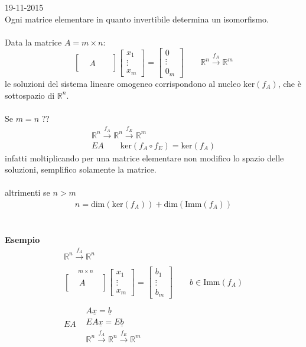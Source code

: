 \documentclass[italian]{article}
\newcommand{\ins}[1]{\text{$\mathbb{#1}$}}
\newcommand{\tright}[1]{\hfill #1 \\}
\renewcommand{\dim}[1]{\text{dim$\left(#1\right)$}}
\renewcommand{\ker}[1]{\text{ker$\left(#1\right)$}}
\newcommand{\imm}[1]{\text{Imm$\left(#1\right)$}}
\begin{document}
\newpage
\tright{19-11-2015}
Ogni matrice elementare in quanto invertibile determina un isomorfismo.\\\\
Data la matrice $A = m \times n$:
\[
	\begin{bmatrix}
		&&& \\ &A& \\ &&&
	\end{bmatrix}
	\begin{bmatrix}
		x_1 \\ \vdots \\ x_m
	\end{bmatrix}
	=
	\begin{bmatrix}
		0 \\ \vdots \\ 0_m
	\end{bmatrix} \qquad
	\ins{R}^n \xrightarrow{f_A} \ins{R}^m
\]
le soluzioni del sistema lineare omogeneo corrispondono al nucleo $\ker{f_A}$, che è sottospazio di $\ins{R}^n$.\\\\
Se $m=n$ ?? 
\begin{gather*}
	\ins{R}^n \xrightarrow{f_A} \ins{R}^n \xrightarrow{f_E} \ins{R}^m \\
	EA \qquad \ker{f_A \circ f_E} = \ker{f_A}
\end{gather*}
infatti moltiplicando per una matrice elementare non modifico lo spazio delle soluzioni, semplifico solamente la matrice.\\\\
altrimenti se $n>m$
\begin{gather*}
	n = \dim{\ker{f_A}} + \dim{\imm{f_A}}
\end{gather*}
\\\\
\textbf{Esempio}
\begin{gather*}
	\ins{R}^n \xrightarrow{f_A} \ins{R}^n \\\\
	\overset{m\times n}{	
		\begin{bmatrix}
			&&& \\ &A& \\ &&&
		\end{bmatrix}
	}
	\begin{bmatrix}
		x_1 \\ \vdots \\ x_m
	\end{bmatrix}
	=
	\begin{bmatrix}
		b_1 \\ \vdots \\ b_m
	\end{bmatrix}
	\qquad b \in \imm{f_A}\\\\
	EA 
	\begin{align*}
		&A\underline{x} = \underline{b} \\
		&EA\underline{x} = E\underline{b} \\
		& \ins{R}^n \xrightarrow{f_A} \ins{R}^n \xrightarrow{f_E} \ins{R}^m
	\end{align*}
\end{gather*}
\end{document}
